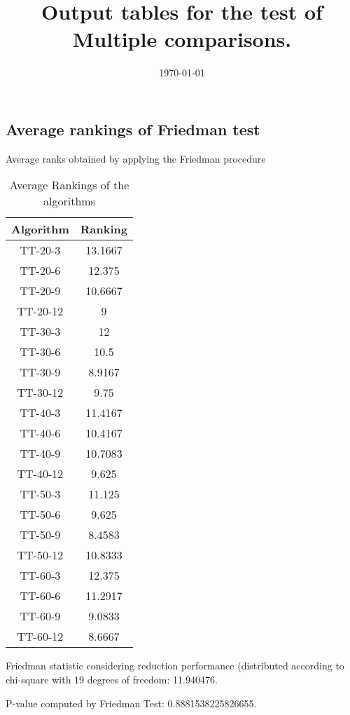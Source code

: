\documentclass[a4paper,10pt]{article}
\title{Output tables for the test of Multiple comparisons.}
\author{}
\date{\today}
\begin{document}
\begin{landscape}
\pagestyle{empty}
\maketitle
\thispagestyle{empty}
\section{Average rankings of Friedman test}



Average ranks obtained by applying the Friedman procedure

\begin{table}[!htp]
\centering
\begin{tabular}{|c|c|}\hline
Algorithm&Ranking\\\hline
TT-20-3 & 13.1667\\
TT-20-6 & 12.375\\
TT-20-9 & 10.6667\\
TT-20-12 & 9\\
TT-30-3 & 12\\
TT-30-6 & 10.5\\
TT-30-9 & 8.9167\\
TT-30-12 & 9.75\\
TT-40-3 & 11.4167\\
TT-40-6 & 10.4167\\
TT-40-9 & 10.7083\\
TT-40-12 & 9.625\\
TT-50-3 & 11.125\\
TT-50-6 & 9.625\\
TT-50-9 & 8.4583\\
TT-50-12 & 10.8333\\
TT-60-3 & 12.375\\
TT-60-6 & 11.2917\\
TT-60-9 & 9.0833\\
TT-60-12 & 8.6667\\
\hline
\end{tabular}
\caption{Average Rankings of the algorithms}
\end{table}

Friedman statistic considering reduction performance (distributed according to chi-square with 19 degrees of freedom: 11.940476.

P-value computed by Friedman Test: 0.8881538225826655.\newline



\pagebreak


\end{landscape}
\end{document}
